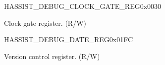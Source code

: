 \begin{register}{H}{ASSIST\_DEBUG\_CLOCK\_GATE\_REG}{0x0030}\label{regdesc:ASSISTDEBUGCLOCKGATEREG}
%
%
\regnewline%
\begin{regdesc}\begin{reglist}
\label{fielddesc:ASSISTDEBUGCLKEN}\item [ASSIST\_DEBUG\_CLK\_EN] Clock gate register. (R/W)
\end{reglist}\end{regdesc}
\end{register}


\begin{register}{H}{ASSIST\_DEBUG\_DATE\_REG}{0x01FC}\label{regdesc:ASSISTDEBUGDATEREG}
%
%
\regnewline%
\begin{regdesc}\begin{reglist}
\label{fielddesc:ASSISTDEBUGDATE}\item [ASSIST\_DEBUG\_DATE] Version control register. (R/W)
\end{reglist}\end{regdesc}
\end{register}


